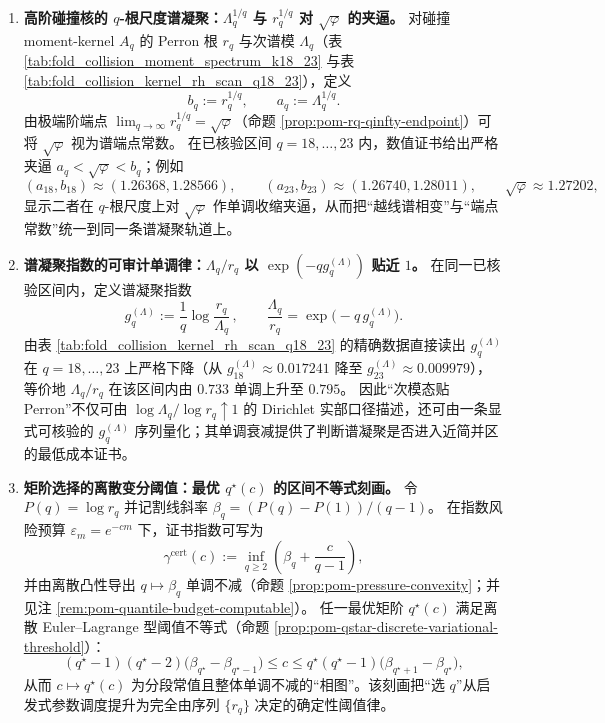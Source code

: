 \begin{enumerate}
  \item \textbf{高阶碰撞核的 \texorpdfstring{$q$}{q}-根尺度谱凝聚：\texorpdfstring{$\Lambda_q^{1/q}$}{Lambda^(1/q)} 与 \texorpdfstring{$r_q^{1/q}$}{r^(1/q)} 对 \texorpdfstring{$\sqrt{\varphi}$}{sqrt(phi)} 的夹逼。}
  对碰撞 moment-kernel \(A_q\) 的 Perron 根 \(r_q\) 与次谱模 \(\Lambda_q\)（表 \ref{tab:fold_collision_moment_spectrum_k18_23} 与表 \ref{tab:fold_collision_kernel_rh_scan_q18_23}），定义
  \[
  b_q:=r_q^{1/q},\qquad a_q:=\Lambda_q^{1/q}.
  \]
  由极端阶端点 \(\lim_{q\to\infty}r_q^{1/q}=\sqrt{\varphi}\)（命题 \ref{prop:pom-rq-qinfty-endpoint}）可将 \(\sqrt{\varphi}\) 视为谱端点常数。
  在已核验区间 \(q=18,\dots,23\) 内，数值证书给出严格夹逼 \(a_q<\sqrt{\varphi}<b_q\)；例如
  \[
  (a_{18},b_{18})\approx(1.26368,1.28566),\qquad
  (a_{23},b_{23})\approx(1.26740,1.28011),
  \qquad
  \sqrt{\varphi}\approx 1.27202,
  \]
  显示二者在 \(q\)-根尺度上对 \(\sqrt{\varphi}\) 作单调收缩夹逼，从而把“越线谱相变”与“端点常数”统一到同一条谱凝聚轨道上。

  \item \textbf{谱凝聚指数的可审计单调律：\texorpdfstring{$\Lambda_q/r_q$}{Lambda/r} 以 \texorpdfstring{$\exp(-qg_q^{(\Lambda)})$}{exp(-qg)} 贴近 \(1\)。}
  在同一已核验区间内，定义谱凝聚指数
  \[
  g_q^{(\Lambda)}:=\frac{1}{q}\log\frac{r_q}{\Lambda_q}\,,
  \qquad
  \frac{\Lambda_q}{r_q}=\exp\!\bigl(-q\,g_q^{(\Lambda)}\bigr).
  \]
  由表 \ref{tab:fold_collision_kernel_rh_scan_q18_23} 的精确数据直接读出 \(g_q^{(\Lambda)}\) 在 \(q=18,\dots,23\) 上严格下降（从 \(g_{18}^{(\Lambda)}\approx 0.017241\) 降至 \(g_{23}^{(\Lambda)}\approx 0.009979\)），等价地 \(\Lambda_q/r_q\) 在该区间内由 \(0.733\) 单调上升至 \(0.795\)。
  因此“次模态贴 Perron”不仅可由 \(\log\Lambda_q/\log r_q\uparrow 1\) 的 Dirichlet 实部口径描述，还可由一条显式可核验的 \(g_q^{(\Lambda)}\) 序列量化；其单调衰减提供了判断谱凝聚是否进入近简并区的最低成本证书。

  \item \textbf{矩阶选择的离散变分阈值：最优 \texorpdfstring{$q^\star(c)$}{q*(c)} 的区间不等式刻画。}
  令 \(P(q)=\log r_q\) 并记割线斜率 \(\beta_q=(P(q)-P(1))/(q-1)\)。
  在指数风险预算 \(\varepsilon_m=e^{-cm}\) 下，证书指数可写为
  \[
  \gamma^{\mathrm{cert}}(c):=\inf_{q\ge 2}\left(\beta_q+\frac{c}{q-1}\right),
  \]
  并由离散凸性导出 \(q\mapsto\beta_q\) 单调不减（命题 \ref{prop:pom-pressure-convexity}；并见注 \ref{rem:pom-quantile-budget-computable}）。
  任一最优矩阶 \(q^\star(c)\) 满足离散 Euler--Lagrange 型阈值不等式（命题 \ref{prop:pom-qstar-discrete-variational-threshold}）：
  \[
  (q^\star-1)(q^\star-2)\bigl(\beta_{q^\star}-\beta_{q^\star-1}\bigr)\le c\le q^\star(q^\star-1)\bigl(\beta_{q^\star+1}-\beta_{q^\star}\bigr),
  \]
  从而 \(c\mapsto q^\star(c)\) 为分段常值且整体单调不减的“相图”。该刻画把“选 \(q\)”从启发式参数调度提升为完全由序列 \(\{r_q\}\) 决定的确定性阈值律。


\end{enumerate}
